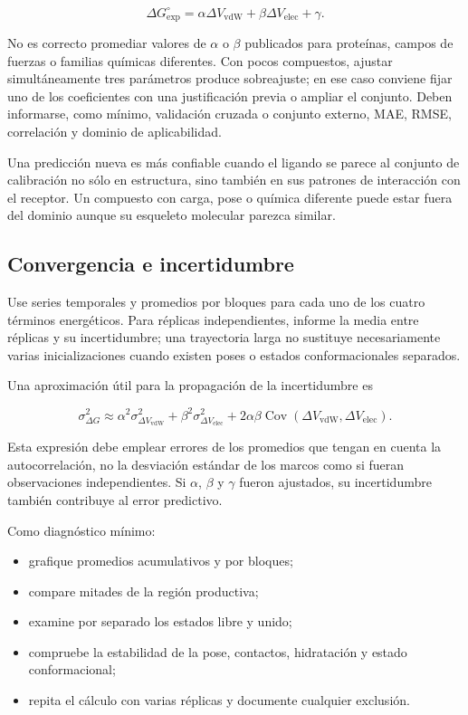 \documentclass[
  spanish,
  11pt,
  a4paper]{article}
\providecommand{\tightlist}{%
  \setlength{\itemsep}{0pt}\setlength{\parskip}{0pt}}
\begin{document}
\[
\Delta G^\circ_{\mathrm{exp}}
=
\alpha\Delta V_{\mathrm{vdW}}
+
\beta\Delta V_{\mathrm{elec}}
+
\gamma .
\]

No es correcto promediar valores de \(\alpha\) o \(\beta\) publicados
para proteínas, campos de fuerzas o familias químicas diferentes. Con
pocos compuestos, ajustar simultáneamente tres parámetros produce
sobreajuste; en ese caso conviene fijar uno de los coeficientes con una
justificación previa o ampliar el conjunto. Deben informarse, como
mínimo, validación cruzada o conjunto externo, MAE, RMSE, correlación y
dominio de aplicabilidad.

Una predicción nueva es más confiable cuando el ligando se parece al
conjunto de calibración no sólo en estructura, sino también en sus
patrones de interacción con el receptor. Un compuesto con carga, pose o
química diferente puede estar fuera del dominio aunque su esqueleto
molecular parezca similar.

\subsection{Convergencia e
incertidumbre}\label{convergencia-e-incertidumbre}

Use series temporales y promedios por bloques para cada uno de los
cuatro términos energéticos. Para réplicas independientes, informe la
media entre réplicas y su incertidumbre; una trayectoria larga no
sustituye necesariamente varias inicializaciones cuando existen poses o
estados conformacionales separados.

Una aproximación útil para la propagación de la incertidumbre es

\[
\sigma^2_{\Delta G}
\approx
\alpha^2\sigma^2_{\Delta V_{\mathrm{vdW}}}
+
\beta^2\sigma^2_{\Delta V_{\mathrm{elec}}}
+
2\alpha\beta\operatorname{Cov}
\left(\Delta V_{\mathrm{vdW}},\Delta V_{\mathrm{elec}}\right).
\]

Esta expresión debe emplear errores de los promedios que tengan en
cuenta la autocorrelación, no la desviación estándar de los marcos como
si fueran observaciones independientes. Si \(\alpha\), \(\beta\) y
\(\gamma\) fueron ajustados, su incertidumbre también contribuye al
error predictivo.

Como diagnóstico mínimo:

\begin{itemize}
\tightlist
\item
  grafique promedios acumulativos y por bloques;
\item
  compare mitades de la región productiva;
\item
  examine por separado los estados libre y unido;
\item
  compruebe la estabilidad de la pose, contactos, hidratación y estado
  conformacional;
\item
  repita el cálculo con varias réplicas y documente cualquier exclusión.
\end{itemize}
\end{document}
